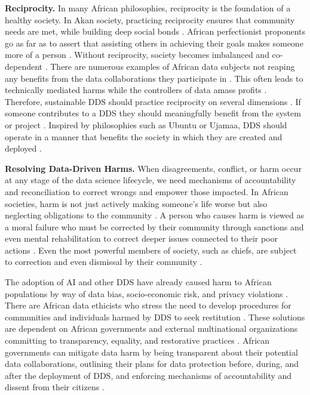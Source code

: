 \textbf{Reciprocity.}
In many African philosophies, reciprocity is the foundation of a healthy society. In Akan society, practicing reciprocity ensures that community needs are met, while building deep social bonds \cite{wiredu2004moralfoundations}. African perfectionist proponents go as far as to assert that assisting others in achieving their goals makes someone more of a person \cite{wareham2021artificial,wiredu2004moralfoundations}. Without reciprocity, society becomes imbalanced and co-dependent \cite{coetzee2004particularity,mhlambi2023decolonizing,nyerere1962ujamaa}. 
There are numerous examples of African data subjects not reaping any benefits from the data collaborations they participate in \cite{gwagwa2019recommendations,abebe2021narratives}. This often leads to technically mediated harms while the controllers of data amass profits \cite{gwagwa2019recommendations}. 
Therefore, sustainable DDS should practice reciprocity on several dimensions \cite{wiredu2004moralfoundations}. If someone contributes to a DDS they should meaningfully benefit from the system or project \cite{mhlambi2020from, gyekye2004person, sinha2023principlesafrofeminist}. Inspired by philosophies such as Ubuntu or Ujamaa, DDS should operate in a manner that benefits the society in which they are created and deployed \cite{eke2023towards, adelani2022masakhaner,dignum2023responsible}. 

\textbf{Resolving Data-Driven Harms.}
When disagreements, conflict, or harm occur at any stage of the data science lifecycle, we need mechanisms of accountability and reconciliation to correct wrongs and empower those impacted. In African societies, harm is not just actively making someone's life worse but also neglecting obligations to the community \cite{wiredu2004akan, gyekye2004person}. A person who causes harm is viewed as a moral failure who must be corrected by their community through sanctions and even mental rehabilitation to correct deeper issues connected to their poor actions \cite{wiredu2004moralfoundations, coetzee2004particularity}. Even the most powerful members of society, such as chiefs, are subject to correction and even dismissal by their community \cite{wiredu2004akan}. 

The adoption of AI and other DDS have already caused harm to African populations by way of data bias, socio-economic risk, and privacy violations \cite{ade-ibijola2023artificial}. 
There are African data ethicists who stress the need to develop procedures for communities and individuals harmed by DDS to seek restitution \cite{gwagwa2019recommendations,mhlambi2023decolonizing}. These solutions are dependent on African governments and external multinational organizations committing to transparency, equality, and restorative practices \cite{gwagwa2019recommendations,african_union2024continental,okolo2023responsible, dignum2023responsible, kiemde2022towards}. African governments can mitigate data harm by being transparent about their potential data collaborations, outlining their plans for data protection before, during, and after the deployment of DDS, and enforcing mechanisms of accountability and dissent from their citizens \cite{shilongo2023creativity, sinha2023principlesafrofeminist}. 

